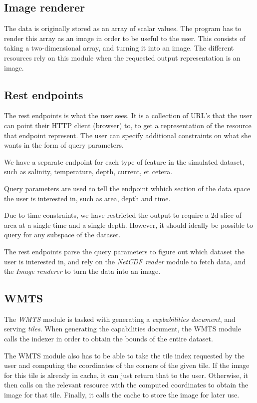 \documentclass[11pt,a4paper,titlepage,oneside]{report}
\begin{document}
\subsection{Image renderer}
The data is originally stored as an array of scalar values. The program has to render this array as an image in order to be useful to the user. This consists of taking a two-dimensional array, and turning it into an image.
The different resources rely on this module when the requested output representation is an image.

\subsection{Rest endpoints}
The rest endpoints is what the user sees. It is a collection of URL's that the user can point their \gls{HTTP} client (browser) to, to get a representation of the resource that endpoint represent. The user can specify additional constraints on what she wants in the form of query parameters. 

We have a separate endpoint for each type of feature in the simulated dataset, such as salinity, temperature, depth, current, et cetera.  

Query parameters are used to tell the endpoint whhich section of the data space the user is interested in, such as area, depth and time.

Due to time constraints, we have restricted the output to require a 2d slice of area at a single time and a single depth. However, it should ideally be possible to query for any subspace of the dataset.

The rest endpoints parse the query parameters to figure out which dataset the user is interested in, and rely on the \textit{NetCDF reader} module to fetch data, and the \textit{Image renderer} to turn the data into an image.

\subsection{WMTS}

The \textit{WMTS} module is tasked with generating a \textit{capbabilities document}, and serving \textit{tiles}. When generating the capabilities document, the WMTS module calls the indexer in order to obtain the bounds of the entire dataset.

The WMTS module also has to be able to take the tile index requested by the user and computing the coordinates of the corners of the given tile. If the image for this tile is already in cache, it can just return that to the user.
Otherwise, it then calls on the relevant resource with the computed coordinates to obtain the image for that tile. Finally, it calls the cache to store the image for later use.
\end{document}
